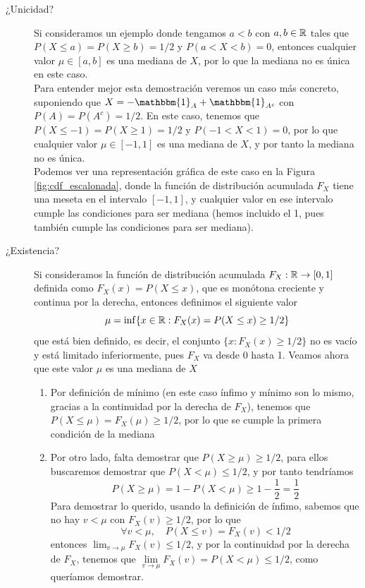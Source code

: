 \begin{description}
    \item[¿Unicidad?] Si consideramos un ejemplo donde tengamos $a<b$ con $a,b\in \mathbb{R}$ tales que $P(X \leq a) = P(X \geq b) = 1/2$ y $P(a < X < b) = 0$, entonces cualquier valor $\mu \in [a,b]$ es una mediana de $X$, por lo que la mediana no es única en este caso. \\
    \noindent
    Para entender mejor esta demostración veremos un caso más concreto, suponiendo que \mbox{$X=-\mathbbm{1}_{A} + \mathbbm{1}_{A^c}$} con $P(A) = P(A^c) = 1/2$. En este caso, tenemos que $P(X \leq -1) = P(X \geq 1) = 1/2$ y $P(-1 < X < 1) = 0$, por lo que cualquier valor $\mu \in [-1,1]$ es una mediana de $X$, y por tanto la mediana no es única. \\
    \noindent
    Podemos ver una representación gráfica de este caso en la Figura \ref{fig:cdf_escalonada}, donde la función de distribución acumulada $F_X$ tiene una meseta en el intervalo $[-1,1]$, y cualquier valor en ese intervalo cumple las condiciones para ser mediana (hemos incluido el 1, pues también cumple las condiciones para ser mediana).
    \item[¿Existencia?] Si consideramos la función de distribución acumulada $F_X:\mathbb{R} \to [0,1]$ definida como $F_X(x) = P(X \leq x)$, que es monótona creciente y continua por la derecha, entonces definimos el siguiente valor
    \begin{equation*}
        \mu = \inf \{ x \in \mathbb{R} : F_X(x)=P(X\leq x) \geq 1/2 \}
    \end{equation*}
    que está bien definido, es decir, el conjunto $\{x : F_X(x) \geq 1/2\}$ no es vacío y está limitado inferiormente, pues $F_X$ va desde 0 hasta 1. Veamos ahora que este valor $\mu$ es una mediana de $X$
    \begin{enumerate}[label=\arabic*)]
        \item Por definición de mínimo (en este caso ínfimo y mínimo son lo mismo, gracias a la continuidad por la derecha de $F_X$), tenemos que $P(X\leq \mu)=F_X(\mu) \geq 1/2$, por lo que se cumple la primera condición de la mediana
        \item Por otro lado, falta demostrar que $P(X \geq \mu) \geq 1/2$, para ellos buscaremos demostrar que $P(X < \mu) \leq 1/2$, y por tanto tendríamos
        \begin{equation*}
            P(X \geq \mu) = 1 - P(X < \mu) \geq 1 - \dfrac{1}{2} = \dfrac{1}{2}
        \end{equation*}
        Para demostrar lo querido, usando la definición de ínfimo, sabemos que no hay $v< \mu$ con $F_X(v) \geq 1/2$, por lo que
        \begin{equation*}
            \forall v < \mu, \quad P(X \leq v) = F_X(v) < 1/2 
        \end{equation*}
        entonces $\lim_{v \to \mu} F_X(v) \leq 1/2$, y por la continuidad por la derecha de $F_X$, tenemos que $\lim\limits_{v \to \mu} F_X(v)=P(X < \mu)  \leq 1/2$, como queríamos demostrar.
    \end{enumerate}
\end{description}

